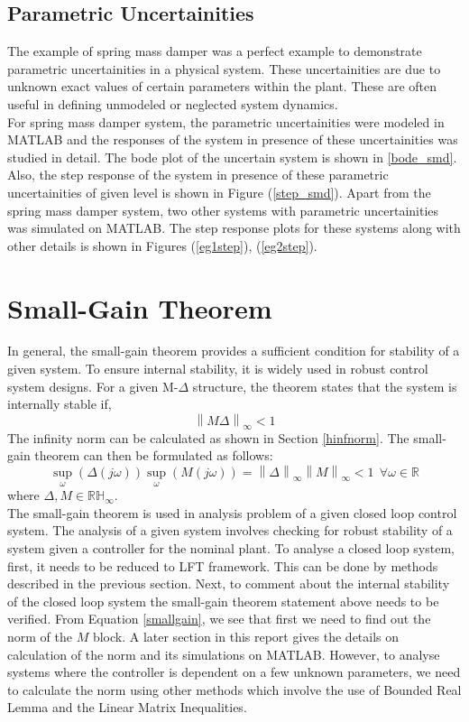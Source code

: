 \documentclass[a4paper,12pt]{article}
\newcommand\norm[1]{\left\lVert#1\right\rVert}
\begin{document}
			\subsection{Parametric Uncertainities} The example of spring mass damper was a perfect example to demonstrate parametric uncertainities in a physical system. These uncertainities are due to unknown exact values of certain parameters within the plant. These are often useful in defining unmodeled or neglected system dynamics. \\
			For spring mass damper system, the parametric uncertainities were modeled in MATLAB and the responses of the system in presence of these uncertainities was studied in detail. The bode plot of the uncertain system is shown in \ref{bode_smd}. Also, the step response of the system in presence of these parametric uncertainities of given level is shown in Figure (\ref{step_smd}). Apart from the spring mass damper system, two other systems with parametric uncertainities was simulated on MATLAB. The step response plots for these systems along with other details is shown in Figures (\ref{eg1step}), (\ref{eg2step}).
		\section{Small-Gain Theorem}\label{small-gain} In general, the small-gain theorem provides a sufficient condition for stability of a given system. To ensure internal stability, it is widely used in robust control system designs. For a given M-$\Delta$ structure, the theorem states that the system is internally stable if, 
		\begin{equation}
			\norm{M\Delta}_{\infty} < 1
		\end{equation}
		The infinity norm can be calculated as shown in Section \ref{hinfnorm}. The small-gain theorem can then be formulated as follows:
		\begin{equation}
			\sup_{\omega}(\Delta(j\omega)) \sup_{\omega}(M(j\omega)) = \norm{\Delta}_{\infty}\norm{M}_{\infty} < 1 \: \: \forall \omega \in \mathbb{R}
			\label{smallgain}
		\end{equation}
		where $\Delta, M \in \mathbb{RH}_{\infty}$.\\
		The small-gain theorem is used in analysis problem of a given closed loop control system. The analysis of a given system involves checking for robust stability of a system given a controller for the nominal plant. To analyse a closed loop system, first, it needs to be reduced to LFT framework. This can be done by methods described in the previous section. Next, to comment about the internal stability of the closed loop system the small-gain theorem statement above needs to be verified. From Equation \ref{smallgain}, we see that first we need to find out the norm of the $M$ block.  A later section in this report gives the details on calculation of the norm and its simulations on MATLAB. However, to analyse systems where the controller is dependent on a few unknown parameters, we need to calculate the norm using other methods which involve the use of Bounded Real Lemma and the Linear Matrix Inequalities. 
\end{document}
